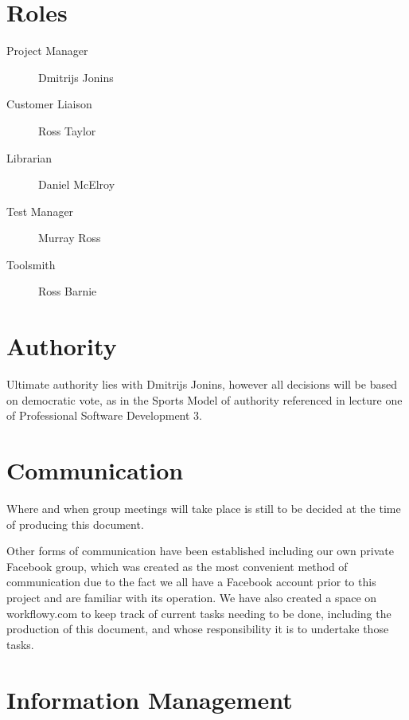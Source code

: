 \documentclass{l3deliverable}
\begin{document}

\section{Roles}

\begin{description}
  \item[Project Manager] Dmitrijs Jonins
  \item[Customer Liaison] Ross Taylor
  \item[Librarian] Daniel McElroy
  \item[Test Manager] Murray Ross
  \item[Toolsmith] Ross Barnie
\end{description}


\section{Authority}

Ultimate authority lies with Dmitrijs Jonins, however all decisions will be 
based on democratic vote, as in the Sports Model of authority referenced in
lecture one of Professional Software Development 3.


\section{Communication}

Where and when group meetings will take place is still to be decided at the 
time of producing this document.

Other forms of communication have been established including our own
private Facebook group, which was created as the most convenient method
of communication due to the fact we all have a Facebook account prior to
this project and are familiar with its operation. 
We have also created a space on workflowy.com to keep track of current tasks 
needing to be done, including the production of this document, and whose 
responsibility it is to undertake those tasks.


\section{Information Management}
\end{document}
